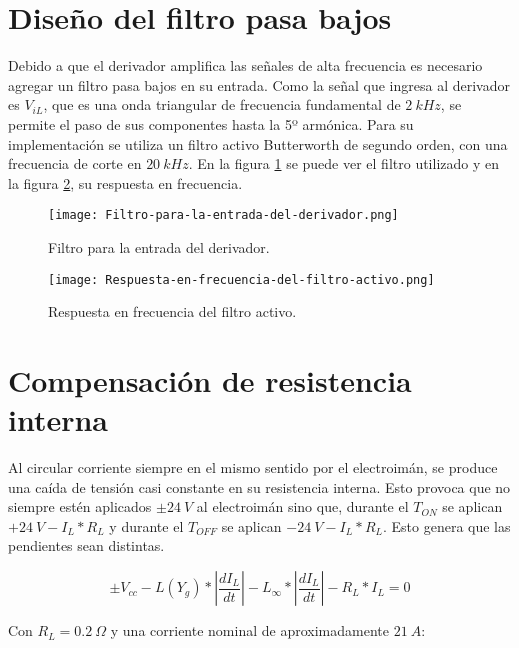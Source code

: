 \section{Diseño del filtro pasa bajos}

Debido a que el derivador amplifica las señales de alta frecuencia es necesario agregar un filtro pasa bajos en su entrada. Como la señal que ingresa al derivador es $V_{iL}$, que es una onda triangular de frecuencia fundamental de $2\:kHz$, se permite el paso de sus componentes hasta la 5º armónica. Para su implementación se utiliza un filtro activo Butterworth de segundo orden, con una frecuencia de corte en $20\:kHz$. En la figura  \ref{fig:img_Filtro-para-la-entrada-del-derivador} se puede ver el filtro utilizado y en la figura \ref{fig:img_Respuesta-en-frecuencia-del-filtro-activo}, su respuesta en frecuencia.

\begin{figure}[H]
	\centering
	\texttt{[image: Filtro-para-la-entrada-del-derivador.png]}
	\caption{Filtro para la entrada del derivador.}
	\label{fig:img_Filtro-para-la-entrada-del-derivador}
\end{figure}

\begin{figure}[H]
	\centering
	\texttt{[image: Respuesta-en-frecuencia-del-filtro-activo.png]}
	\caption{Respuesta en frecuencia del filtro activo.}
	\label{fig:img_Respuesta-en-frecuencia-del-filtro-activo}
\end{figure}

\section{Compensación de resistencia interna}

Al circular corriente siempre en el mismo sentido por el electroimán, se produce una caída de tensión casi constante en su resistencia interna. Esto provoca que no siempre estén aplicados $\pm 24\:V$ al electroimán sino que, durante el $T_{ON}$ se aplican $+24\:V-I_L*R_L$ y durante el $T_{OFF}$ se aplican $-24\:V-I_L*R_L$. Esto genera que las pendientes sean distintas.

\begin{equation} \label{eq_Vbus-didt-RL}
	\pm V_{cc}-L(Y_g)*\left|\frac{{dI}_L}{dt}\right|-L_{\infty }*\left|\frac{{dI}_L}{dt}\right|-R_L*I_L=0
\end{equation}

Con  $R_L=0.2 \:\Omega$ y una corriente nominal  de aproximadamente $21\:A$:

